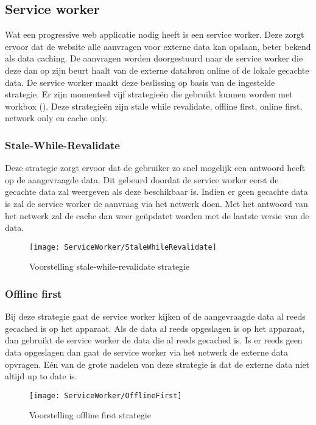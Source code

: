 \subsection{Service worker}
Wat een progressive web applicatie nodig heeft is een service worker. Deze zorgt ervoor dat de website alle aanvragen voor externe data kan opslaan, beter bekend als data caching. De aanvragen worden doorgestuurd naar de service worker die deze dan op zijn beurt haalt van de externe databron online of de lokale gecachte data. De service worker maakt deze beslissing op basis van de ingestelde strategie. Er zijn momenteel vijf strategieën die gebruikt kunnen worden met workbox (\cite{WORKBOX_STRATEGIES}). Deze strategieën zijn stale while revalidate, offline first, online first, network only en cache only.

\subsubsection{Stale-While-Revalidate}
Deze strategie zorgt ervoor dat de gebruiker zo snel mogelijk een antwoord heeft op de aangevraagde data. Dit gebeurd doordat de service worker eerst de gecachte data zal weergeven als deze beschikbaar is. Indien er geen gecachte data is zal de service worker de aanvraag via het netwerk doen. Met het antwoord van het netwerk zal de cache dan weer geüpdatet worden met de laatste versie van de data.

\begin{figure}[!h]
	\texttt{[image: ServiceWorker/StaleWhileRevalidate]}\centering
	\caption{Voorstelling stale-while-revalidate strategie}
\end{figure}

\subsubsection{Offline first}
Bij deze strategie gaat de service worker kijken of de aangevraagde data al reeds gecached is op het apparaat. Als de data al reeds opgeslagen is op het apparaat, dan gebruikt de service worker de data die al reeds gecached is. Is er reeds geen data opgeslagen dan gaat de service worker via het netwerk de externe data opvragen. Eén van de grote nadelen van deze strategie is dat de externe data niet altijd up to date is.

\begin{figure}[!h]
	\texttt{[image: ServiceWorker/OfflineFirst]}\centering
	\caption{Voorstelling offline first strategie}
\end{figure}

